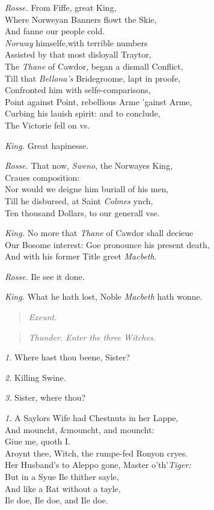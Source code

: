 \documentclass[12pt]{sides}
\newcommand{\StageDir}[1]{\begin{quote}\centering\em #1\end{quote}}
\newcommand{\dia}[1]{\hskip 15pt\textit{#1}\hskip 6pt}
\begin{document}
\begin{multicols}{2}
			\dia{Rosse.} From Fiffe, great King, \\ Where Norweyan Banners flowt the Skie, \\ And fanne our people cold. \\ \textit{Norway} himselfe,with terrible numbers \\ Assisted by that most disloyall Traytor, \\ The \textit{Thane} of Cawdor, began a dismall Conflict, \\ Till that \textit{Bellona's} Bridegroome, lapt in proofe, \\ Confronted him with selfe-comparisons, \\ Point against Point, rebellious Arme 'gainst Arme, \\ Curbing his lauish spirit: and to conclude, \\ The Victorie fell on vs.
			
			\dia{King.} Great hapinesse.
			
			\dia{Rosse.} That now, \textit{Sweno}, the Norwayes King, \\ Craues composition: \\ Nor would we deigne him buriall of his men, \\ Till he disbursed, at Saint \textit{Colmes} ynch, \\ Ten thousand Dollars, to our generall vse.
			
			\dia{King.} No more that \textit{Thane} of Cawdor shall decieue \\ Our Bosome interest: Goe pronounce his present death, \\ And with his former Title greet \textit{Macbeth}.
			
			\dia{Rosse.} Ile see it done.
			
			\dia{King.} What he hath lost, Noble \textit{Macbeth} hath wonne.
            \StageDir{\vspace{-\baselineskip} \hfill Exeunt.} %
			
			\StageDir{Thunder. Enter the three Witches.}
			
			\dia{1.} Where hast thou beene, Sister?
			
			\dia{2.} Killing Swine.
			
			\dia{3.} Sister, where thou?
			
			\dia{1.} A Saylors Wife had Chestnuts in her Lappe, \\ And mouncht, \&mouncht, and mouncht: \\ Giue me, quoth I. \\ Aroynt thee, Witch, the rumpe-fed Ronyon cryes. \\ Her Husband's to Aleppo gone, Master o'th'\textit{Tiger:} \\ But in a Syue Ile thither sayle, \\ And like a Rat without a tayle, \\ Ile doe, Ile doe, and Ile doe.
			

\end{multicols}
\end{document}
